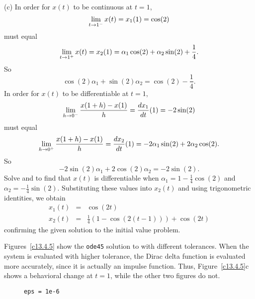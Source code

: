 (c) In order for $x(t)$ to be continuous at $t = 1$,
\[
\displaystyle\lim_{t \rightarrow 1^{-}} x(t) = x_1(1) = \cos(2)
\]
must equal
\[
\displaystyle\lim_{t \rightarrow 1^{+}} x(t) = x_2(1) =
\alpha_1\cos(2) + \alpha_2\sin(2) + \frac{1}{4}.
\]
So
\begin{equation} \label{ex:13.4.2a}
\cos(2)\alpha_1 + \sin(2)\alpha_2 = \cos(2) - \frac{1}{4}.
\end{equation}
In order for $x(t)$ to be differentiable at $t = 1$,
\[
\displaystyle\lim_{h \rightarrow 0^{-}} \frac{x(1 + h) - x(1)}{h} =
\frac{dx_1}{dt}(1) = -2\sin(2)
\]
must equal
\[
\displaystyle\lim_{h \rightarrow 0^{+}} \frac{x(1 + h) - x(1)}{h} =
\frac{dx_2}{dt}(1) = -2\alpha_1\sin(2) + 2\alpha_2\cos(2).
\]
So
\begin{equation} \label{ex:13.4.2b}
-2\sin(2)\alpha_1 + 2\cos(2)\alpha_2 = -2\sin(2).
\end{equation}
Solve  and  to find that $x(t)$ is
differentiable when $\alpha_1 = 1 - \frac{1}{4}\cos(2)$ and $\alpha_2
= -\frac{1}{4}\sin(2)$.  Substituting these values into $x_2(t)$ and
using trigonometric identities, we obtain
\[
\begin{array}{rcl}
x_1(t) & = & \cos(2t) \\
x_2(t) & = & \frac{1}{4}(1 - \cos(2(t - 1))) + \cos(2t)
\end{array}
\]
confirming the given solution to the initial value problem.











 \ans Figures~\ref{c13.4.5} show the {\tt ode45} solution
to  with different tolerances.  When the system is
evaluated with higher tolerance, the Dirac delta function is evaluated
more accurately, since it is actually an impulse function.  Thus,
Figure~\ref{c13.4.5}c shows a behavioral change at $t = 1$, while the
other two figures do not.

\begin{figure}[htb]
                       \centerline{%
                       }
                \centerline{{\tt eps = 1e-6}\hspace{1.2in}{\tt eps = 1e-8}
\hspace{1.2in}{\tt eps = 1e-10}}
\end{figure}


